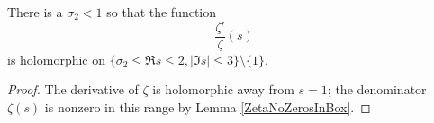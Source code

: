 \begin{lemma}[LogDerivZetaHolcSmallT]
\label{LogDerivZetaHolcSmallT}
\leanok
There is a $\sigma_2 < 1$ so that the function
  $$
  \frac {\zeta'}{\zeta}(s)
  $$
  is holomorphic on $\{ \sigma_2 \le \Re s \le 2, |\Im s| \le 3 \} \setminus \{1\}$.
\end{lemma}
\begin{proof}
\leanok
The derivative of $\zeta$ is holomorphic away from $s=1$; the denominator $\zeta(s)$ is nonzero
  in this range by Lemma \ref{ZetaNoZerosInBox}.
\end{proof}

